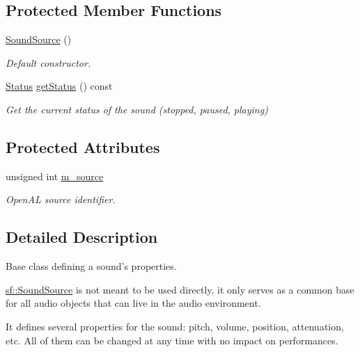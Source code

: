 \subsection*{Protected Member Functions}
\begin{DoxyCompactItemize}
\item 
\hyperlink{classsf_1_1_sound_source_aefa4bd4460f387d81a0637d293979436}{Sound\+Source} ()
\begin{DoxyCompactList}\small\item\em Default constructor. \end{DoxyCompactList}\item 
\hyperlink{classsf_1_1_sound_source_ac43af72c98c077500b239bc75b812f03}{Status} \hyperlink{classsf_1_1_sound_source_ad1995d2888773f47f99b671747609dbb}{get\+Status} () const 
\begin{DoxyCompactList}\small\item\em Get the current status of the sound (stopped, paused, playing) \end{DoxyCompactList}\end{DoxyCompactItemize}
\subsection*{Protected Attributes}
\begin{DoxyCompactItemize}
\item 
\hypertarget{classsf_1_1_sound_source_a0223cef4b1c587e6e1e17b4c92c4479c}{unsigned int \hyperlink{classsf_1_1_sound_source_a0223cef4b1c587e6e1e17b4c92c4479c}{m\+\_\+source}}\label{classsf_1_1_sound_source_a0223cef4b1c587e6e1e17b4c92c4479c}

\begin{DoxyCompactList}\small\item\em Open\+A\+L source identifier. \end{DoxyCompactList}\end{DoxyCompactItemize}


\subsection{Detailed Description}
Base class defining a sound's properties. 

\hyperlink{classsf_1_1_sound_source}{sf\+::\+Sound\+Source} is not meant to be used directly, it only serves as a common base for all audio objects that can live in the audio environment.

It defines several properties for the sound\+: pitch, volume, position, attenuation, etc. All of them can be changed at any time with no impact on performances.


